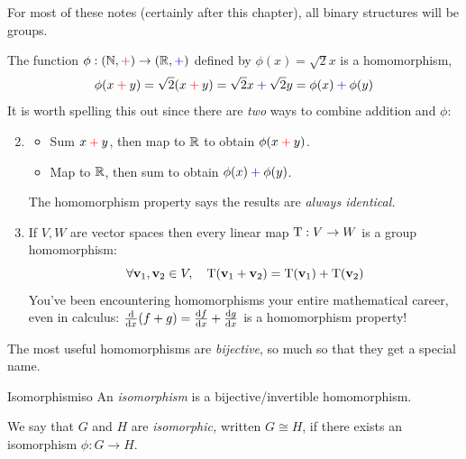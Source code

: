 For most of these notes (certainly after this chapter), all binary structures will be groups.



\begin{examples}{}{}
	\exstart The%
	\def\opbl{\mathbin{\textcolor{blue}{+}}}
	\def\oprd{\mathbin{\textcolor{red}{+}}} 
	function $\phi:(\N,\textcolor{red}{+})\to(\R,\textcolor{blue}{+})$ defined by $\phi(x)=\sqrt 2x$ is a homomorphism,\vspace{-2pt}
	\[
		\phi(x\oprd y)=\sqrt 2(x\oprd y)=\sqrt 2x\opbl \sqrt 2y=\phi(x)\opbl \phi(y)
	\]
	It is worth spelling this out since there are \emph{two} ways to combine addition and $\phi$:\vspace{-5pt}
	\begin{enumerate}\setcounter{enumi}{1}\itemsep2pt
	  \item[]\begin{itemize}
	  	\item Sum $x\oprd y$, then map to $\R$ to obtain $\phi(x\oprd y)$.
	  	\item Map to $\R$, then sum to obtain $\phi(x)\opbl\phi(y)$.
		\end{itemize}
		The homomorphism property says the results are \emph{always identical.}
		
	  \item If $V,W$ are vector spaces then every linear map $\rT:V\to W$ is a group homomorphism:\footnotemark
	  \[
	  	\forall\vv_1,\vv_2\in V,\quad \rT(\vv_1+\vv_2)=\rT(\vv_1)+\rT(\vv_2)
	  \]
	  You've been encountering homomorphisms your entire mathematical career, even in calculus: $\diff x(f+g)=\diff[f]{x}+\diff[g]{x}$ is a homomorphism property! 
	\end{enumerate}
\end{examples}



The most useful homomorphisms are \emph{bijective}, so much so that they get a special name.

\begin{defn}{Isomorphism}{iso}
	An \emph{isomorphism} is a bijective/invertible homomorphism.\footnotemark\par
	We say that $G$ and $H$ are \emph{isomorphic,} written $G\cong H$, if there exists an isomorphism $\phi:G\to H$.
\end{defn}


